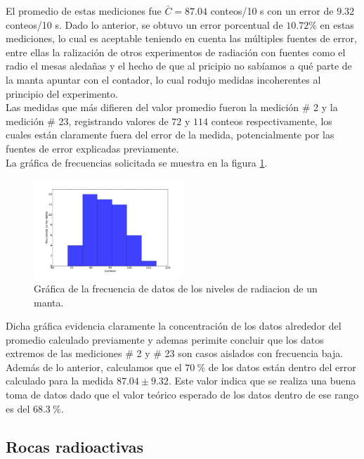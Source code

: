 \documentclass[prb,aps,twocolumn,preprintnumbers,amsmath,amssymb]{revtex4}
\begin{document}
El promedio de estas mediciones fue $\bar{C} = 87.04$ conteos/10 s con un error de $9.32$ conteos/10 s. Dado lo anterior, se obtuvo un error porcentual de $10.72 \%$ en estas mediciones, lo cual es aceptable teniendo en cuenta las múltiples fuentes de error, entre ellas la ralización de otros experimentos de radiación con fuentes como el radio el mesas aledañas y el hecho de que al pricipio no sabíamos a qué parte de la manta apuntar con el contador, lo cual rodujo medidas incoherentes al principio del experimento.\\

Las medidas que más difieren del valor promedio fueron la medición \# 2 y la medición \# 23, registrando valores de $72$ y $114$ conteos respectivamente, los cuales están claramente fuera del error de la medida, potencialmente por las fuentes de error explicadas previamente.\\

La gráfica de frecuencias solicitada se muestra en la figura \ref{fig: frecuencia}.

\begin{figure}[h!]
	\centering
	\includegraphics[width=0.5\textwidth]{frequency}
	\caption{ Gráfica de la frecuencia de datos de los niveles de radiacion de un manta. }
	\label{fig: frecuencia}
\end{figure}

Dicha gráfica evidencia claramente la concentración de los datos alrededor del promedio calculado previamente y ademas perimite concluir que los datos extremos de las mediciones \# 2 y \# 23 son casos aislados con frecuencia baja. Además de lo anterior, calculamos que el $70 \ \%$ de los datos están dentro del error calculado para la medida $87.04 \pm 9.32$. Este valor indica que se realiza una buena toma de datos dado que el valor teórico esperado de los datos dentro de ese rango es del $68.3\ \%$.

\subsection{Rocas radioactivas}
 
\end{document}
